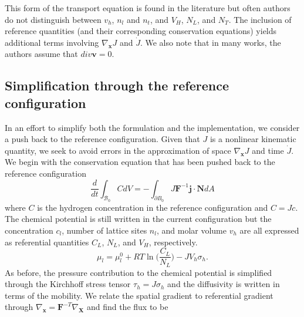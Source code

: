 \documentclass[10pt]{elsarticle}
\newcommand{\mbs}[1]{\boldsymbol{#1}}
\def\bs{{\mbs{s}}} \def\bt{{\mbs{t}}} \def\bu{{\mbs{u}}}
\def\bs{\boldsymbol}
\begin{document}
This form of the transport equation is found in the literature but often authors do not distinguish between $v_{h}$, $n_{l}$ and $n_{t}$, and $V_{H}$, $N_{L}$, and $N_{T}$. The inclusion of reference quantities (and their corresponding conservation equations) yields additional terms involving $\nabla_{\bs{x}}J$ and $\dot{J}$.  We also note that in many works, the authors assume that $div\bs{v} = 0$.  

\subsection{Simplification through the reference configuration}
In an effort to simplify both the formulation and the implementation, we consider a push back to the reference configuration. Given that $J$ is a nonlinear kinematic quantity, we seek to avoid errors in the approximation of space $\nabla_{\bs{x}}J$ and time  $\dot{J}$. We begin with the conservation equation that has been pushed back to the reference configuration
%
\begin{equation}
\label{eq.hconservationref} \frac{d}{dt} \int_{\mathcal{B}_{0}} C dV = -\int_{\partial B_{0}} J\bs{F}^{-1}\bs{j} \cdot \bs{N} dA 
\end{equation}
where $C$ is the hydrogen concentration in the reference configuration and $C = Jc$. The chemical potential is still written in the current configuration but the concentration $c_{l}$, number of lattice sites $n_{l}$, and molar volume $v_{h}$ are all expressed as referential quantities $C_{L}$, $N_{L}$, and $V_{H}$, respectively.
%
\begin{equation}
\label{eq.chemical.potential}{\mu_{l} = \mu^{0}_{l} + R T \ln \bigg( \frac{C_{L}}{N_{L}} \bigg) - J V_{h} \sigma_{h}}.
\end{equation}
%
As before, the pressure contribution to the chemical potential is simplified through the Kirchhoff stress tensor $\tau_{h} = J\sigma_{h}$ and the diffusivity is written in terms of the mobility. We relate the spatial gradient to referential gradient through $\nabla_{\bs{x}} = \bs{F}^{-T}\nabla_{\bs{X}}$ and find the flux to be 
%
%
\end{document}
